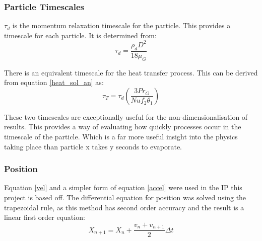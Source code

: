 \documentclass[../Interim_Report_Master]{subfiles}
\begin{document}
\subsubsection{Particle Timescales}
$\tau_d$ is the momentum relaxation timescale for the particle. This provides a timescale for each particle. It is determined from:
\begin{equation}
\tau_d = \frac{\rho_d D^2}{18\mu_G}
\end{equation}

There is an equivalent timescale for the heat transfer process. This can be derived from equation \ref{heat_sol_an} as:
\begin{equation}
\tau_T = \tau_d\left(\frac{3Pr_G}{Nu f_2 \theta_1}\right)
\end{equation}


These two timescales are exceptionally useful for the non-dimensionalisation of results. This provides a way of evaluating how quickly processes occur in the timescale of the particle. Which is a far more useful insight into the physics taking place than particle x takes y seconds to evaporate.

\subsubsection{Position}
Equation \ref{vel} and a simpler form of equation \ref{accel} were used in the IP this project is based off. The differential equation for position was solved using the trapezoidal rule, as this method has second order accuracy and the result is a linear first order equation:
\begin{equation}
X_{n+1} = X_{n} + \frac{v_{n}+v_{n+1}}{2} \Delta t
\end{equation}

\cite{Elijah_GPU_Report}
\end{document}
